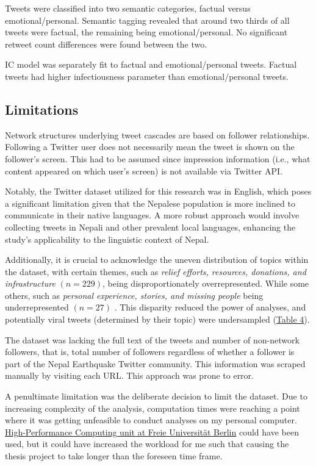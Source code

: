 \documentclass[11pt,a4paper]{article}
\begin{document}
    Tweets were classified into two semantic categories, factual versus emotional/personal. Semantic tagging revealed that around two thirds of all tweets were factual, the remaining being emotional/personal. No significant retweet count differences were found between the two.

    IC model was separately fit to factual and emotional/personal tweets. Factual tweets had higher infectiousness parameter than emotional/personal tweets.
    
    \subsection{Limitations}
    Network structures underlying tweet cascades are based on follower relationships. Following a Twitter user does not necessarily mean the tweet is shown on the follower’s screen. This had to be assumed since impression information (i.e., what content appeared on which user’s screen) is not available via Twitter API. 

    Notably, the Twitter dataset utilized for this research was in English, which poses a significant limitation given that the Nepalese population is more inclined to communicate in their native languages. A more robust approach would involve collecting tweets in Nepali and other prevalent local languages, enhancing the study's applicability to the linguistic context of Nepal.

    Additionally, it is crucial to acknowledge the uneven distribution of topics within the dataset, with certain themes, such as \textit{relief efforts, resources, donations, and infrastructure} $(n = 229)$, being disproportionately overrepresented. While some others, such as \textit{personal experience, stories, and missing people} being underrepresented $(n = 27)$ . This disparity reduced the power of analyses, and potentially viral tweets (determined by their topic) were undersampled (\hyperlink{fig:topic-dist}{Table 4}).
    
    The dataset was lacking the full text of the tweets and number of non-network followers, that is, total number of followers regardless of whether a follower is part of the Nepal Earthquake Twitter community. This information was scraped manually by visiting each URL. This approach was prone to error.
    
    A penultimate limitation was the deliberate decision to limit the dataset. Due to increasing complexity of the analysis, computation times were reaching a point where it was getting unfeasible to conduct analyses on my personal computer. \hyperref[https://www.fu-berlin.de/en/sites/high-performance-computing/index.html]{High-Performance Computing unit at Freie Universität Berlin}  could have been used, but it could have increased the workload for me such that causing the thesis project to take longer than the foreseen time frame.
    
\end{document}

